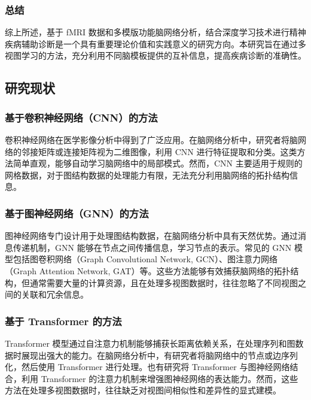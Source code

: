 \documentclass[12pt,a4paper]{article}
\begin{document}
\subsubsection{总结}

综上所述，基于 fMRI 数据和多模版功能脑网络分析，结合深度学习技术进行精神疾病辅助诊断是一个具有重要理论价值和实践意义的研究方向。本研究旨在通过多视图学习的方法，充分利用不同脑模板提供的互补信息，提高疾病诊断的准确性。

\subsection{研究现状}

\subsubsection{基于卷积神经网络（CNN）的方法}

卷积神经网络在医学影像分析中得到了广泛应用。在脑网络分析中，研究者将脑网络的邻接矩阵或连接矩阵视为二维图像，利用 CNN 进行特征提取和分类。这类方法简单直观，能够自动学习脑网络中的局部模式。然而，CNN 主要适用于规则的网格数据，对于图结构数据的处理能力有限，无法充分利用脑网络的拓扑结构信息。

\subsubsection{基于图神经网络（GNN）的方法}

图神经网络专门设计用于处理图结构数据，在脑网络分析中具有天然优势。通过消息传递机制，GNN 能够在节点之间传播信息，学习节点的表示。常见的 GNN 模型包括图卷积网络（Graph Convolutional Network, GCN）\cite{kipf2016semi}、图注意力网络（Graph Attention Network, GAT）\cite{velickovic2017graph}等。这些方法能够有效捕获脑网络的拓扑结构，但通常需要大量的计算资源，且在处理多视图数据时，往往忽略了不同视图之间的关联和冗余信息。

\subsubsection{基于 Transformer 的方法}

Transformer 模型通过自注意力机制能够捕获长距离依赖关系，在处理序列和图数据时展现出强大的能力。在脑网络分析中，有研究者将脑网络中的节点或边序列化，然后使用 Transformer 进行处理。也有研究将 Transformer 与图神经网络结合，利用 Transformer 的注意力机制来增强图神经网络的表达能力。然而，这些方法在处理多视图数据时，往往缺乏对视图间相似性和差异性的显式建模。
\end{document}
